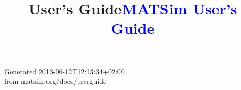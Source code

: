 \documentclass[a4paper,11pt]{report}
\title{User's Guide}
\begin{document}

\title{\textcolor{blue}{\sf MATSim User's Guide}}
\maketitle

\tableofcontents

Generated 2013-06-12T12:13:34+02:00
\\from matsim.org/docs/userguide

















\vfill\eject




\end{document}
